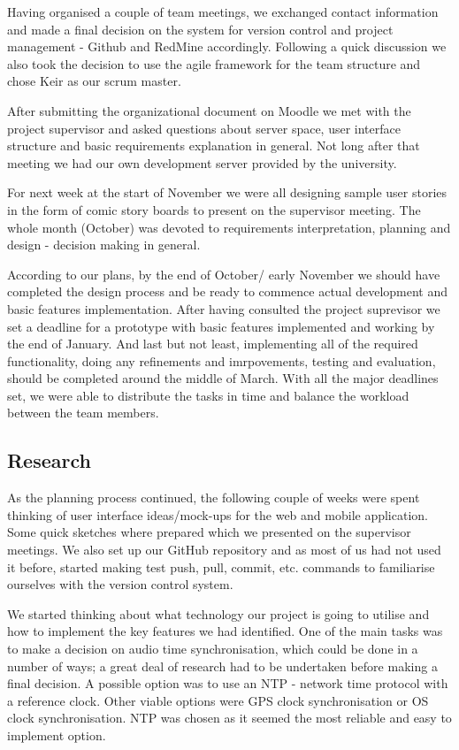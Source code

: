 \documentclass{l3proj}
\begin{document}
Having organised a couple of team meetings, we exchanged contact information and made a final decision on the system for version control and project management - Github and RedMine accordingly. Following a quick discussion we also took the decision to use the agile framework for the team structure and chose Keir as our scrum master.

After submitting the organizational document on Moodle we met with the project supervisor and asked questions about server space, user interface structure and basic requirements explanation in general. Not long after that meeting we had our own development server provided by the university.

For next week at the start of November we were all designing sample user stories in the form of comic story boards to present on the supervisor meeting. The whole month (October) was devoted to requirements interpretation, planning and design - decision making in general.

According to our plans, by the end of October/ early November we should have completed the design process and be ready to commence actual development and basic features implementation. After having consulted the project suprevisor we set a deadline for a prototype with basic features implemented and working by the end of January. And last but not least, implementing all of the required functionality, doing any refinements and imrpovements, testing and evaluation, should be completed around the middle of March. With all the major deadlines set, we were able to distribute the tasks in time and balance the workload between the team members.

\subsection{Research}

As the planning process continued, the following couple of weeks were spent thinking of user interface ideas/mock-ups for the web and mobile application. Some quick sketches where prepared which we presented on the supervisor meetings. We also set up our GitHub repository and as most of us had not used it before, started making test push, pull, commit, etc. commands to familiarise ourselves with the version control system.

We started thinking about what technology our project is going to utilise and how to implement the key features we had identified. One of the main tasks was to make a decision on audio time synchronisation, which could be done in a number of ways; a great deal of research had to be undertaken before making a final decision. A possible option was to use an NTP - network time protocol with a reference clock. Other viable options were GPS clock synchronisation or OS clock synchronisation. NTP was chosen as it seemed the most reliable and easy to implement option.
\end{document}
